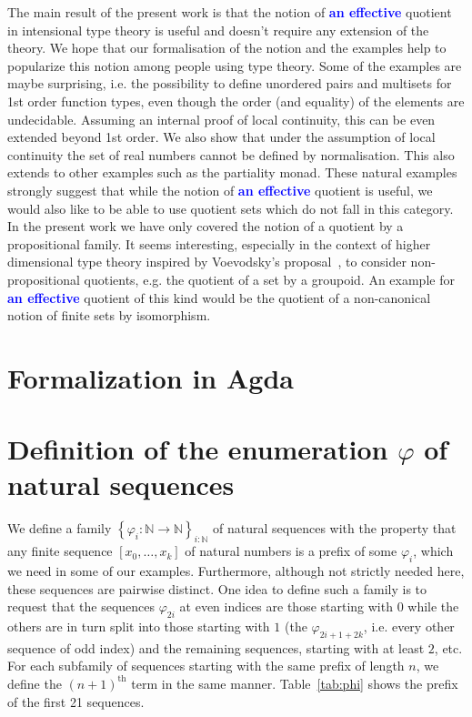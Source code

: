 \documentclass[envcountsame]{llncs}
\newcommand{\amend}[2][]{\textcolor{blue}{#2}}
\newcommand{\adefinable}{\amend[]{\textbf{an effective }}}
\newcommand{\N}{\mathbb{N}}
\providecommand{\set}  [1]{\left\{#1\right\}}
\begin{document}
The main result of the present work is that the notion of \adefinable
quotient in intensional type theory is useful and doesn't require any
extension of the theory. We hope that our formalisation of the notion
and the examples help to popularize this notion among people using
type theory. Some of the examples are maybe surprising, i.e. the
possibility to define unordered pairs and multisets for 1st order
function types, even though the order (and equality) of the elements
are undecidable. Assuming an internal proof of local continuity, this
can be even extended beyond 1st order. We also show that under the
assumption of local continuity the set of real numbers cannot be
defined by normalisation. This also extends to other examples such as
the partiality monad. These natural examples strongly suggest that
while the notion of \adefinable quotient is useful, we would also like
to be able to use quotient sets which do not fall in this category.
In the present work we have only covered the notion of a quotient by a
propositional family. It seems interesting, especially in the
context of higher dimensional type theory inspired by Voevodsky's proposal~\cite{voevodsky}, to consider
non-propositional quotients, e.g. the quotient of a set by a
groupoid. An example for \adefinable quotient of this kind would be
the quotient of a non-canonical notion of finite sets by isomorphism.




\appendix

\section{Formalization in Agda}\label{app:agda:quotients}



\section{Definition of the enumeration $\varphi$ of natural sequences}\label{app:haskell:phi}
We define a family $\set{\varphi_i:\N\to\N}_{i:\N}$ of natural sequences with the property that any finite sequence $[x_0,\dots,x_k]$ of natural numbers is a prefix of some $\varphi_i$, which we need in some of our examples. Furthermore, although not strictly needed here, these sequences are pairwise distinct. One idea to define such a family is to request that the sequences $\varphi_{2i}$ at even indices are those starting with $0$ while the others are in turn split into  those starting with $1$ (the $\varphi_{2i+1+2k}$, i.e. every other sequence of odd index) and the remaining sequences, starting with at least $2$, etc. For each subfamily of sequences starting with the same prefix of length $n$, we define the $(n+1)^{\text{th}}$ term in the same manner.
Table~\ref{tab:phi} shows the prefix of the first 21 sequences.
\end{document}
